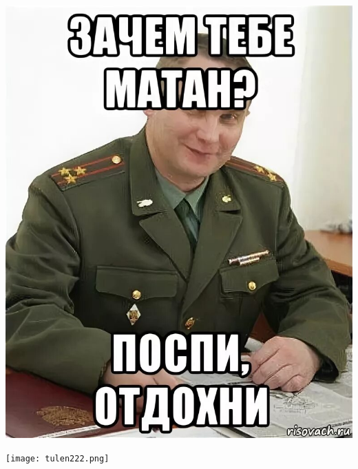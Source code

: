 \begin{titlepage}
\begin{minipage}{0.365\textwidth}
    \end{minipage}
    \vspace{10pt}
        \noindent 
    \begin{minipage}{0.3\textwidth}
    \includegraphics[width=\textwidth]{images/i (9).jpeg}
    \end{minipage}
    \begin{minipage}{0.3\textwidth}
    \texttt{[image: tulen222.png]}


\end{minipage}
\end{titlepage}
